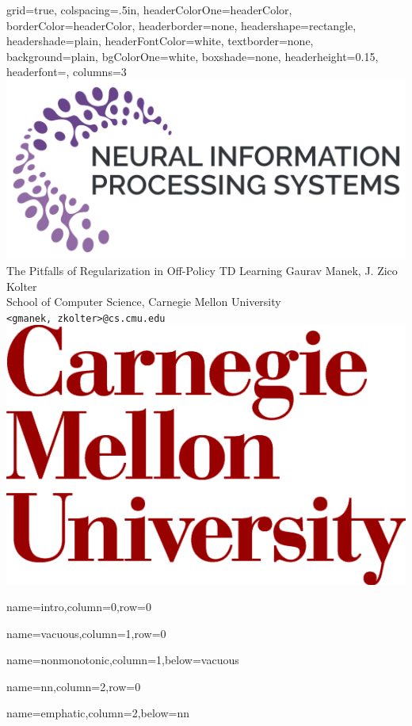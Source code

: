 \documentclass[landscape,paperwidth=96in,paperheight=48in,fontscale=0.2]{baposter}
\begin{document}
\begin{poster}{
    grid=true,
    colspacing=.5in,
    headerColorOne=headerColor, borderColor=headerColor,
    headerborder=none, headershape=rectangle,
    headershade=plain, headerFontColor=white, textborder=none,
    background=plain, bgColorOne=white, boxshade=none,
    headerheight=0.15\textheight,
    headerfont=\headerfont,
    columns=3
  }{
    \includegraphics[height=0.11\textheight]{images/neurips-logo}
  }{
    {{\titlefont The Pitfalls of Regularization in Off-Policy TD Learning }}
  }{\vspace{2mm}\large
    Gaurav Manek, J. Zico Kolter \\
    School of Computer Science, Carnegie Mellon University \\
    \texttt{<gmanek, zkolter>@cs.cmu.edu}
  }{\includegraphics[height=0.11\textheight]{images/cmu-logo}}

  {name=intro,column=0,row=0}{}

  {name=vacuous,column=1,row=0}{}

  {name=nonmonotonic,column=1,below=vacuous}{}

  {name=nn,column=2,row=0}{}

  {name=emphatic,column=2,below=nn}{}


\end{poster}
\end{document}
